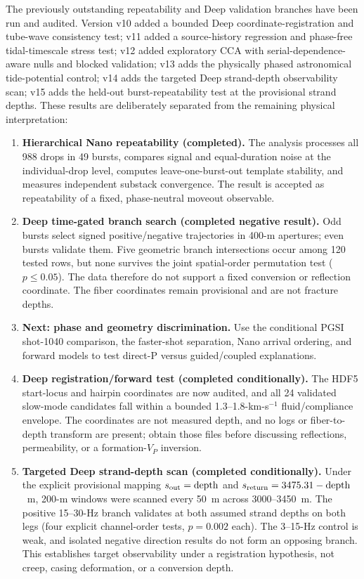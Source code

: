\documentclass[11pt]{article}
\begin{document}
The previously outstanding repeatability and Deep validation branches have been run and audited.  Version v10 added a bounded Deep coordinate-registration and tube-wave consistency test; v11 added a source-history regression and phase-free tidal-timescale stress test; v12 added exploratory CCA with serial-dependence-aware nulls and blocked validation; v13 adds the physically phased astronomical tide-potential control; v14 adds
the targeted Deep strand-depth observability scan; v15 adds the held-out
burst-repeatability test at the provisional strand depths.  These results are deliberately separated from the remaining physical interpretation:
\begin{enumerate}[leftmargin=*]
  \item \textbf{Hierarchical Nano repeatability (completed).}  The analysis
  processes all 988 drops in 49 bursts, compares signal and equal-duration
  noise at the individual-drop level, computes leave-one-burst-out template
  stability, and measures independent substack convergence.  The result is
  accepted as repeatability of a fixed, phase-neutral moveout observable.
  \item \textbf{Deep time-gated branch search (completed negative result).}
  Odd bursts select signed positive/negative trajectories in 400-m apertures;
  even bursts validate them.  Five geometric branch intersections occur among
  120 tested rows, but none survives the joint spatial-order permutation test
  ($p\leq0.05$).  The data therefore do not support a fixed conversion or
  reflection coordinate.  The fiber coordinates remain provisional and are
  not fracture depths.
  \item \textbf{Next: phase and geometry discrimination.}  Use the conditional
  PGSI shot-1040 comparison, the faster-shot separation, Nano arrival ordering,
  and forward models to test direct-P versus guided/coupled explanations.
  \item \textbf{Deep registration/forward test (completed conditionally).}  The
  HDF5 start-locus and hairpin coordinates are now audited, and all 24 validated
  slow-mode candidates fall within a bounded 1.3--1.8-km-s$^{-1}$ fluid/compliance
  envelope.  The coordinates are not measured depth, and no logs or fiber-to-depth
  transform are present; obtain those files before discussing reflections,
  permeability, or a formation-$V_P$ inversion.
  \item \textbf{Targeted Deep strand-depth scan (completed conditionally).}
  Under the explicit provisional mapping $s_{\rm out}=\mathrm{depth}$ and
  $s_{\rm return}=3475.31-\mathrm{depth}$~m, 200-m windows were scanned every
  50~m across 3000--3450~m.  The positive 15--30-Hz branch validates at both
  assumed strand depths on both legs (four explicit channel-order tests,
  $p=0.002$ each).  The 3--15-Hz control is weak, and isolated negative
  direction results do not form an opposing branch.  This establishes target
  observability under a registration hypothesis, not creep, casing deformation,
  or a conversion depth.
\end{enumerate}
\end{document}
